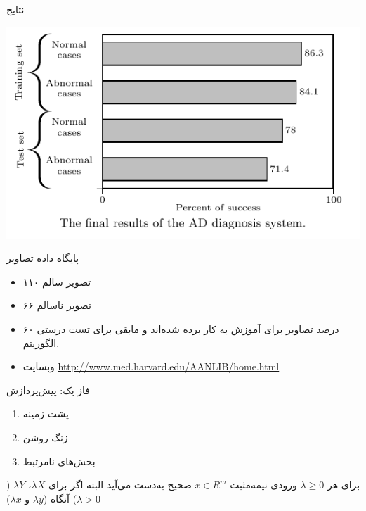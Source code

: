 \documentclass[debug,a0paper,portrait,persian]{xebaposter}
\begin{document}
\begin{poster}
\begin{posterbox}[name=results,column=1,span=2,below=phase2]{نتایج}
\begin{multicols}{2}
    \centerline{\includegraphics[scale=.7]{fig5}}
\end{multicols}
\end{posterbox}
\begin{posterbox}[name=imagedataset,column=0,span=1,below=introduction]{پایگاه داده تصاویر}
\begin{itemize}
	\item ۱۱۰ تصویر سالم
	\item ۶۶ تصویر ناسالم
	\item ۶۰ درصد تصاویر برای آموزش به کار برده شده‌اند و مابقی برای تست درستی الگوریتم.
	\item وبسایت \url{http://www.med.harvard.edu/AANLIB/home.html}
\end{itemize}
\end{posterbox}
\begin{posterbox}[name=phase1,column=0,span=1,below=imagedataset]{فاز یک{:} پیش‌پردازش}
\ptext[12]
\begin{enumerate}
	\item پشت زمینه
	\item زنگ روشن
	\item بخش‌های نامرتبط
\end{enumerate}
\ptext[14]

برای هر $\lambda \geq 0$ ورودی نیمه‌مثبت $x\in R^m$ صحیح به‌دست می‌آید البته اگر برای $\lambda X$، $\lambda Y$ ($\lambda >0$) آنگاه ($\lambda y$ و $\lambda x$)


\end{posterbox}
\end{poster}
\end{document}
